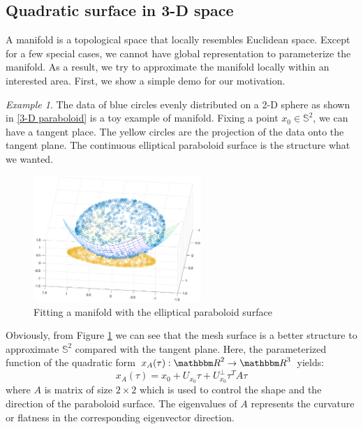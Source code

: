 \documentclass{article}
\theoremstyle{remark}
\newtheorem{example}{Example}
\begin{document}
\subsection{Quadratic surface in 3-D space}
A manifold is a topological space that locally resembles Euclidean space. Except for a few special cases, we cannot have global representation to parameterize the manifold. As a result, we try to approximate the manifold locally within an interested area. First, we show a simple demo for our motivation.

\begin{example}
The data of blue circles evenly distributed on a 2-D sphere as shown in \eqref{3-D paraboloid} is a toy example of manifold. Fixing a point $x_0\in {\mathbb S}^2$, we can have a tangent place. The yellow circles are the projection of the data onto the tangent plane. The continuous elliptical paraboloid surface is the structure what we wanted.
\begin{figure}[h] %
   \centering
   \includegraphics[width=2.5in]{demo.eps} 
   \caption{ Fitting a manifold with the elliptical paraboloid surface}
   \label{3-D paraboloid}
\end{figure}

Obviously, from Figure \ref{3-D paraboloid} we can see that the mesh surface is a better structure to approximate $\mathbb{S}^2$ compared with the tangent plane. Here,  the parameterized function of the quadratic form  $x_A(\tau): {\mathbbm R}^2\rightarrow {\mathbbm R}^3$ yields:
\[
x_A(\tau) = x_0 + U_{x_0} \tau + {U_{x_0}^\perp} \tau^T A \tau
\]
where $A$ is matrix of size $2\times 2$ which is used to control the shape and the direction of the paraboloid surface. The eigenvalues of $A$ represents the curvature or flatness in the corresponding eigenvector direction.
\end{example}
\end{document}
